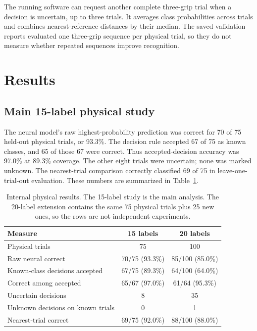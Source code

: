 \documentclass[12pt,a4paper]{article}
\begin{document}
The running software can request another complete three-grip trial when a decision is uncertain, up to three trials. It averages class probabilities across trials and combines nearest-reference distances by their median. The saved validation reports evaluated one three-grip sequence per physical trial, so they do not measure whether repeated sequences improve recognition.

\section{Results}

\subsection{Main 15-label physical study}

The neural model's raw highest-probability prediction was correct for 70 of 75 held-out physical trials, or 93.3\%. The decision rule accepted 67 of 75 as known classes, and 65 of those 67 were correct. Thus accepted-decision accuracy was 97.0\% at 89.3\% coverage. The other eight trials were uncertain; none was marked unknown. The nearest-trial comparison correctly classified 69 of 75 in leave-one-trial-out evaluation. These numbers are summarized in Table~\ref{tab:summary}.

\begin{table}[ht]
\centering
\caption{Internal physical results. The 15-label study is the main analysis. The 20-label extension contains the same 75 physical trials plus 25 new ones, so the rows are not independent experiments.}
\label{tab:summary}
\begin{tabular}{lcc}
\toprule
Measure & 15 labels & 20 labels \\
\midrule
Physical trials & 75 & 100 \\
Raw neural correct & 70/75 (93.3\%) & 85/100 (85.0\%) \\
Known-class decisions accepted & 67/75 (89.3\%) & 64/100 (64.0\%) \\
Correct among accepted & 65/67 (97.0\%) & 61/64 (95.3\%) \\
Uncertain decisions & 8 & 35 \\
Unknown decisions on known trials & 0 & 1 \\
Nearest-trial correct & 69/75 (92.0\%) & 88/100 (88.0\%) \\
\bottomrule
\end{tabular}
\end{table}
\end{document}
